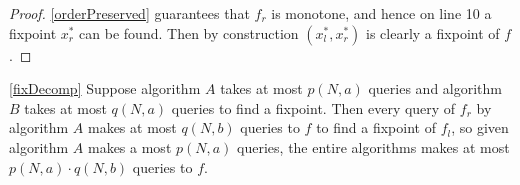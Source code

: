 \begin{proof}
  \cref{orderPreserved} guarantees that $f_r$ is monotone, and hence
  on line 10 a fixpoint $x_r^*$ can be found. Then by construction
  $(x_l^*, x_r^*)$ is clearly a fixpoint of $f$.
\end{proof}
\begin{proofOf}{\cref{fixDecomp}}
  Suppose algorithm $A$ takes at most $p(N, a)$ queries and algorithm $B$ takes at most
  $q(N, a)$ queries to find a fixpoint. Then every query of $f_r$ by algorithm $A$
  makes at most $q(N, b)$ queries to $f$ to find a fixpoint of $f_l$, so
  given algorithm $A$ makes a most $p(N, a)$ queries, the entire algorithms
  makes at most $p(N, a) \cdot q(N, b)$ queries to $f$.
\end{proofOf}

